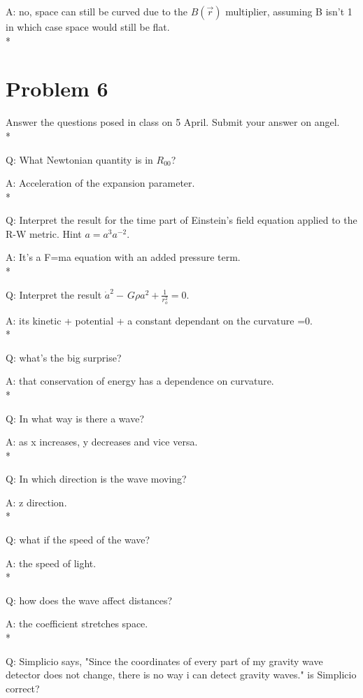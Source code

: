 \documentclass{article}
\begin{document}
A: no, space can still be curved due to the $B(\vec r)$ multiplier, assuming B isn't 1 in which case space would still be flat. 
\\*

\section{Problem 6}
\hspace{0.5cm}Answer the questions posed in class on 5 April. Submit your answer on angel.
\\*

Q: What Newtonian quantity is in $R_{00}$?

A: Acceleration of the expansion parameter.
\\*

Q: Interpret the result for the time part of Einstein's field equation applied to the R-W metric. Hint $a=a^{3}a^{-2}$. 

A: It's a F=ma equation with an added pressure term. 
\\*

Q: Interpret the result $\dot{a}^{2}-\frac{}{}G\rho a^{2}+\frac{1}{r_{o}^{2}}=0$. 

A: its kinetic + potential + a constant dependant on the curvature =0.
\\*

Q: what's the big surprise?

A: that conservation of energy has a dependence on curvature.
\\*

Q: In what way is there a wave? 

A: as x increases, y decreases and vice versa. 
\\*

Q: In which direction is the wave moving?

A: z direction.
\\*

Q: what if the speed of the wave? 

A: the speed of light.
\\*

Q: how does the wave affect distances?

A: the coefficient stretches space.
\\*

Q: Simplicio says, "Since the coordinates of every part of my gravity wave detector does not change, there is no way i can detect gravity waves." is Simplicio correct?
\end{document}
